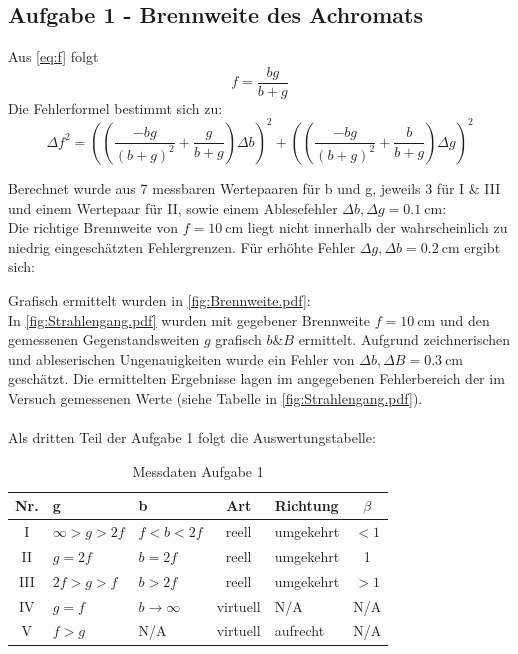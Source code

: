 \subsection{Aufgabe 1 - Brennweite des Achromats}
Aus \cref{eq:f} folgt
\begin{equation}
    f=\frac{bg}{b+g}
\end{equation}
Die Fehlerformel bestimmt sich zu:
\begin{equation}
    \Delta f^{2}=\left(\left(\frac{-bg}{(b+g)^{2}}+\frac{g}{b+g}\right)\Delta b\right)^{2}+\left(\left(\frac{-bg}{(b+g)^{2}}+\frac{b}{b+g}\right)\Delta g\right)^{2}
\end{equation}

Berechnet wurde aus 7 messbaren Wertepaaren für b und g, jeweils 3 für I \& III und einem Wertepaar für II, sowie einem Ablesefehler \(\Delta b , \Delta g = \qty{0,1}{\cm}\):\\
Die richtige Brennweite von \(f=\qty{10}{\cm}\) liegt nicht innerhalb der wahrscheinlich zu niedrig eingeschätzten Fehlergrenzen. Für erhöhte Fehler \(\Delta g, \Delta b = \qty{0,2}{\cm}\) ergibt sich:\\

Grafisch ermittelt wurden in \cref{fig:Brennweite.pdf}:\\
In \cref{fig:Strahlengang.pdf} wurden mit gegebener Brennweite \(f=\qty{10}{\cm}\) und den gemessenen Gegenstandsweiten \(g\) grafisch \(b\)\&\(B\) ermittelt. Aufgrund zeichnerischen und ableserischen Ungenauigkeiten wurde ein Fehler von \(\Delta b,\Delta B=\qty{0,3}{\cm}\) geschätzt. 
Die ermittelten Ergebnisse lagen im angegebenen Fehlerbereich der im Versuch gemessenen Werte (siehe Tabelle in \cref{fig:Strahlengang.pdf}).\\\\
Als dritten Teil der Aufgabe 1 folgt die Auswertungstabelle:
\begin{table}[htbp]
\centering
\renewcommand{\arraystretch}{1.5}
\begin{tabularx}{0.8\textwidth}{c TTcTc}
\toprule
\textbf{Nr.} & \textbf{g} & \textbf{b} & \textbf{Art} & \textbf{Richtung} & \boldmath\(\beta\) \\
\midrule
I & \(\infty > g > 2f\) & \(f < b < 2f\) & reell & umgekehrt & \(<1\) \\
II & \(g = 2f\) & \(b  =2f\) & reell & umgekehrt & 1 \\
III & \(2f > g > f\) & \(b > 2f\) & reell & umgekehrt & \(>1\) \\
IV & \(g = f\) & \(b \rightarrow \infty\) & virtuell & N/A & N/A \\
V & \(f > g\) & N/A & virtuell & aufrecht & N/A \\
\bottomrule
\end{tabularx}
\caption{Messdaten Aufgabe 1}
\end{table}
\clearpage

